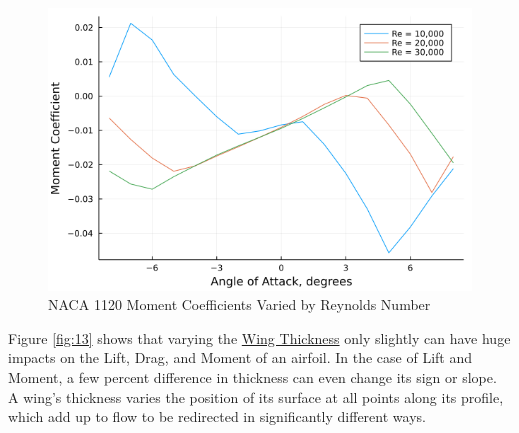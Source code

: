 \documentclass{article}
\begin{document}
\begin{figure}[!htb]
\endminipage\hfill
{}
  \includegraphics[width=\linewidth]{Figure12.png}
  \caption{NACA 1120 Moment Coefficients Varied by Reynolds Number}\label{fig:12}
\endminipage
\end{figure}

Figure \ref{fig:13} shows that varying the \hyperlink{Th}{Wing Thickness} only slightly can have huge impacts on the Lift, Drag, and Moment of an airfoil. In the case of Lift and Moment, a few percent difference in thickness can even change its sign or slope. A wing's thickness varies the position of its surface at all points along its profile, which add up to flow to be redirected in significantly different ways.
\end{document}
